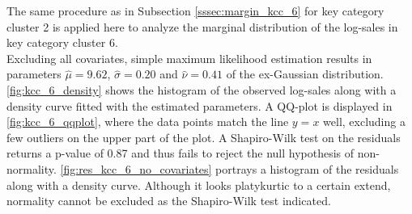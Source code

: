 
The same procedure as in Subsection \ref{sssec:margin_kcc_6} for key category cluster 2 is applied here to analyze the marginal distribution of the log-sales in key category cluster 6.\\

Excluding all covariates, simple maximum likelihood estimation results in parameters $\hat{\mu} = 9.62$, $\hat{\sigma} = 0.20$ and $\hat{\nu} = 0.41$ of the ex-Gaussian distribution.
\autoref{fig:kcc_6_density} shows the histogram of the observed log-sales along with a density curve fitted with the estimated parameters. A QQ-plot is displayed in \autoref{fig:kcc_6_qqplot}, where the data points match the line $y=x$ well, excluding a few outliers on the upper part of the plot.
 A Shapiro-Wilk test on the residuals returns a p-value of 0.87 and thus fails to reject the null hypothesis of non-normality. \autoref{fig:res_kcc_6_no_covariates} portrays a histogram of the residuals along with a density curve. Although it looks platykurtic to a certain extend, normality cannot be excluded as the Shapiro-Wilk test indicated.
\\


%



